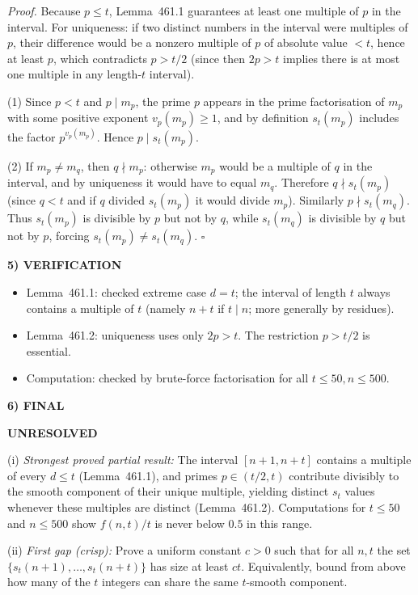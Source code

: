 \textit{Proof.}
Because $p\le t$, Lemma~461.1 guarantees at least one multiple of $p$ in the interval. For uniqueness: if two distinct numbers in the interval were multiples of $p$, their difference would be a nonzero multiple of $p$ of absolute value $<t$, hence at least $p$, which contradicts $p>t/2$ (since then $2p>t$ implies there is at most one multiple in any length-$t$ interval).

(1) Since $p<t$ and $p\mid m_p$, the prime $p$ appears in the prime factorisation of $m_p$ with some positive exponent $v_p(m_p)\ge 1$, and by definition $s_t(m_p)$ includes the factor $p^{v_p(m_p)}$. Hence $p\mid s_t(m_p)$.

(2) If $m_p\neq m_q$, then $q\nmid m_p$: otherwise $m_p$ would be a multiple of $q$ in the interval, and by uniqueness it would have to equal $m_q$. Therefore $q\nmid s_t(m_p)$ (since $q<t$ and if $q$ divided $s_t(m_p)$ it would divide $m_p$). Similarly $p\nmid s_t(m_q)$. Thus $s_t(m_p)$ is divisible by $p$ but not by $q$, while $s_t(m_q)$ is divisible by $q$ but not by $p$, forcing $s_t(m_p)\neq s_t(m_q)$. \hfill$\square$

\medskip
\noindent\textbf{5) VERIFICATION}

\begin{itemize}
\item Lemma~461.1: checked extreme case $d=t$; the interval of length $t$ always contains a multiple of $t$ (namely $n+t$ if $t\mid n$; more generally by residues).
\item Lemma~461.2: uniqueness uses only $2p>t$. The restriction $p>t/2$ is essential.
\item Computation: checked by brute-force factorisation for all $t\le 50, n\le 500$.
\end{itemize}

\noindent\textbf{6) FINAL}

\textbf{UNRESOLVED}

(i) \emph{Strongest proved partial result:} The interval $[n+1,n+t]$ contains a multiple of every $d\le t$ (Lemma~461.1), and primes $p\in(t/2,t)$ contribute divisibly to the smooth component of their unique multiple, yielding distinct $s_t$ values whenever these multiples are distinct (Lemma~461.2). Computations for $t\le 50$ and $n\le 500$ show $f(n,t)/t$ is never below $0.5$ in this range.

(ii) \emph{First gap (crisp):} Prove a uniform constant $c>0$ such that for all $n,t$ the set $\{s_t(n+1),\dots,s_t(n+t)\}$ has size at least $ct$. Equivalently, bound from above how many of the $t$ integers can share the same $t$-smooth component.

